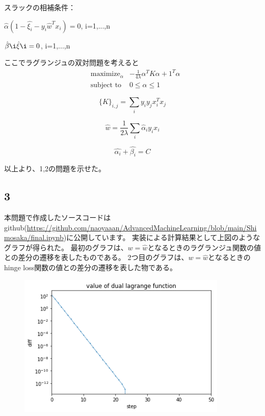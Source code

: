 \documentclass[a4j,11pt]{jarticle}
\begin{document}
スラックの相補条件：
\begin{center}
    $\hat{\alpha}(1-\hat{\xi_i}-y_i\hat{w}^Tx_i) = 0$, i=1,...,n

    $\hat{\beta}\i \hat{\xi}\i = 0$, i=1,...,n
\end{center}

ここでラグランジュの双対問題を考えると
\begin{equation}
    \begin{aligned}
        & \text{maximize}_{\alpha}
            & -\frac{1}{4\lambda}\alpha^TK\alpha+1^T\alpha\\
        &\text{subject to}
            & 0\leq\alpha\leq 1
    \end{aligned}
\end{equation}

\begin{equation*}
    \{K\}_{i,j} = \sum_i y_i y_j x_i^T x_j
\end{equation*}

\begin{equation*}
    \hat{w} = \frac{1}{2\lambda}\sum_i \hat{\alpha}_i y_i x_i
\end{equation*}

\begin{equation*}
    \hat{\alpha_i} + \hat{\beta_i} = C
\end{equation*}

以上より、1,2の問題を示せた。

\subsection*{3}
本問題で作成したソースコードはgithub(\url{https://github.com/naoyaaan/AdvancedMachineLearning/blob/main/Shimosaka/final.ipynb})に公開しています。
\newpage
実装による計算結果として上図のようなグラフが得られた。
最初のグラフは、$w=\hat{w}$となるときのラグランジュ関数の値との差分の遷移を表したものである。
2つ目のグラフは、$w=\hat{w}$となるときのhinge loss関数の値との差分の遷移を表した物である。

\begin{figure}
    \centering
    \includegraphics[width=10cm]{p3-3-1.png}
\end{figure}
\end{document}
